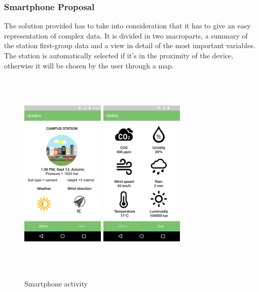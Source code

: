 \documentclass[12pt]{article} %
\begin{document}
\subsubsection{Smartphone Proposal}
The solution provided has to take into consideration that it has to give an easy representation of complex data. It is divided in two macroparts, a summary of the station first-group data and a view in detail of the most important variables.
The station is automatically selected if it's in the proximity of the device, otherwise it will be chosen by the user through a map.


\begin{figure}[H]
  \centering
  \includegraphics[width=4cm,height=10cm,keepaspectratio]{img/StationSummary.png}
  \hspace{0.1\textwidth}
  \includegraphics[width=4cm,height=10cm,keepaspectratio]{img/DataActivity.png}
  \hfill
  \caption{Smartphone activity}
  \label{fig:boat1}
\end{figure}
\end{document}
